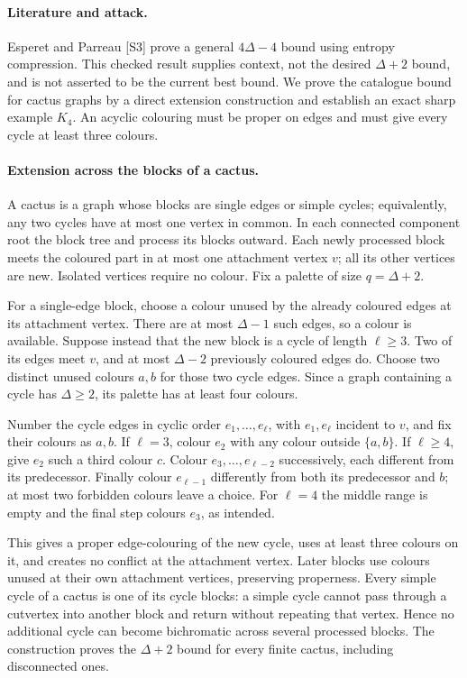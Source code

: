 \documentclass[11pt,a4paper]{article}
\begin{document}
\paragraph{Literature and attack.}
Esperet and Parreau [S3] prove a general $4\Delta-4$ bound using entropy compression. This checked result supplies context, not the desired $\Delta+2$ bound, and is not asserted to be the current best bound. We prove the catalogue bound for cactus graphs by a direct extension construction and establish an exact sharp example $K_4$. An acyclic colouring must be proper on edges and must give every cycle at least three colours.

\paragraph{Extension across the blocks of a cactus.}
A cactus is a graph whose blocks are single edges or simple cycles; equivalently, any two cycles have at most one vertex in common. In each connected component root the block tree and process its blocks outward. Each newly processed block meets the coloured part in at most one attachment vertex $v$; all its other vertices are new. Isolated vertices require no colour. Fix a palette of size $q=\Delta+2$.

For a single-edge block, choose a colour unused by the already coloured edges at its attachment vertex. There are at most $\Delta-1$ such edges, so a colour is available. Suppose instead that the new block is a cycle of length $\ell\ge3$. Two of its edges meet $v$, and at most $\Delta-2$ previously coloured edges do. Choose two distinct unused colours $a,b$ for those two cycle edges. Since a graph containing a cycle has $\Delta\ge2$, its palette has at least four colours.

Number the cycle edges in cyclic order $e_1,\ldots,e_\ell$, with $e_1,e_\ell$ incident to $v$, and fix their colours as $a,b$. If $\ell=3$, colour $e_2$ with any colour outside $\{a,b\}$. If $\ell\ge4$, give $e_2$ such a third colour $c$. Colour $e_3,\ldots,e_{\ell-2}$ successively, each different from its predecessor. Finally colour $e_{\ell-1}$ differently from both its predecessor and $b$; at most two forbidden colours leave a choice. For $\ell=4$ the middle range is empty and the final step colours $e_3$, as intended.

This gives a proper edge-colouring of the new cycle, uses at least three colours on it, and creates no conflict at the attachment vertex. Later blocks use colours unused at their own attachment vertices, preserving properness. Every simple cycle of a cactus is one of its cycle blocks: a simple cycle cannot pass through a cutvertex into another block and return without repeating that vertex. Hence no additional cycle can become bichromatic across several processed blocks. The construction proves the $\Delta+2$ bound for every finite cactus, including disconnected ones.
\end{document}
